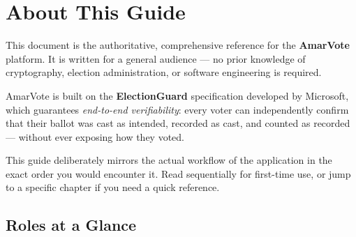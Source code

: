 \documentclass[12pt,a4paper,openany]{book}
\begin{document}
\frontmatter
\tableofcontents

\chapter*{About This Guide}

This document is the authoritative, comprehensive reference for the \textbf{AmarVote} platform. It is written for a general audience --- no prior knowledge of cryptography, election administration, or software engineering is required.

AmarVote is built on the \textbf{ElectionGuard} specification developed by Microsoft, which guarantees \emph{end-to-end verifiability}: every voter can independently confirm that their ballot was cast as intended, recorded as cast, and counted as recorded --- without ever exposing how they voted.

\vspace{0.5cm}
\begin{tcolorbox}[notebox]
	This guide deliberately mirrors the actual workflow of the application in the exact order you would encounter it. Read sequentially for first-time use, or jump to a specific chapter if you need a quick reference.
\end{tcolorbox}

\vspace{0.5cm}

\section*{Roles at a Glance}
\end{document}
